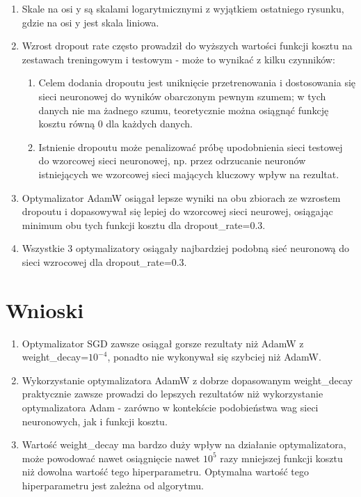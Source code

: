 \documentclass[12pt]{article}
\begin{document}
\begin{enumerate}
	\item Skale na osi y są skalami logarytmicznymi z wyjątkiem ostatniego rysunku, gdzie na osi y jest skala liniowa.
	\item Wzrost dropout rate często prowadził do wyższych wartości funkcji kosztu na zestawach treningowym i testowym - może to wynikać z kilku czynników:
	\begin{enumerate}
		\item Celem dodania dropoutu jest uniknięcie przetrenowania i dostosowania się sieci neuronowej do wyników obarczonym pewnym szumem; w tych danych nie ma żadnego szumu, teoretycznie można osiągnąć funkcję kosztu równą 0 dla każdych danych.
		\item Istnienie dropoutu może penalizować próbę upodobnienia sieci testowej do wzorcowej sieci neuronowej, np. przez odrzucanie neuronów istniejących we wzorcowej sieci mających kluczowy wpływ na rezultat.
	\end{enumerate}
	\item Optymalizator AdamW osiągał lepsze wyniki na obu zbiorach ze wzrostem dropoutu i dopasowywał się lepiej do wzorcowej sieci neurowej, osiągając minimum obu tych funkcji kosztu dla dropout\_rate=0.3.
	\item Wszystkie 3 optymalizatory osiągały najbardziej podobną sieć neuronową do sieci wzrocowej dla dropout\_rate=0.3.
	
\end{enumerate}

\clearpage

\section{Wnioski}
\begin{enumerate}
	\item Optymalizator SGD zawsze osiągał gorsze rezultaty niż AdamW z weight\_decay=$10^{-4}$, ponadto nie wykonywał się szybciej niż AdamW.
	\item Wykorzystanie optymalizatora AdamW z dobrze dopasowanym weight\_decay praktycznie zawsze prowadzi do lepszych rezultatów niż wykorzystanie optymalizatora Adam - zarówno w kontekście podobieństwa wag sieci neuronowych, jak i funkcji kosztu.
	\item Wartość weight\_decay ma bardzo duży wpływ na działanie optymalizatora, może powodować nawet osiągnięcie nawet $10^5$ razy mniejszej funkcji kosztu niż dowolna wartość tego hiperparametru. Optymalna wartość tego hiperparametru jest zależna od algorytmu.
\end{enumerate}
\end{document}
